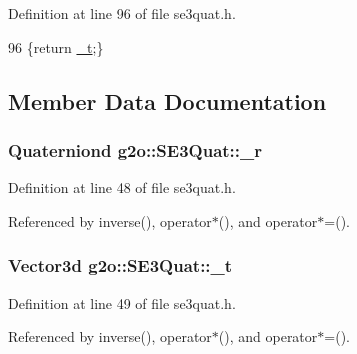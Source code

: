 Definition at line 96 of file se3quat.\+h.


\begin{DoxyCode}
96 \{\textcolor{keywordflow}{return} \hyperlink{classg2o_1_1SE3Quat_a7f0078e2750e8f821926f2d51202a809}{\_t};\}
\end{DoxyCode}


\subsection{Member Data Documentation}
\subsubsection[{\texorpdfstring{\+\_\+r}{_r}}]{\setlength{\rightskip}{0pt plus 5cm}Quaterniond g2o\+::\+S\+E3\+Quat\+::\+\_\+r\hspace{0.3cm}{\ttfamily [protected]}}\hypertarget{classg2o_1_1SE3Quat_a420255bcfca499dc2669b27fd373f665}{}\label{classg2o_1_1SE3Quat_a420255bcfca499dc2669b27fd373f665}


Definition at line 48 of file se3quat.\+h.



Referenced by inverse(), operator$\ast$(), and operator$\ast$=().

\subsubsection[{\texorpdfstring{\+\_\+t}{_t}}]{\setlength{\rightskip}{0pt plus 5cm}Vector3d g2o\+::\+S\+E3\+Quat\+::\+\_\+t\hspace{0.3cm}{\ttfamily [protected]}}\hypertarget{classg2o_1_1SE3Quat_a7f0078e2750e8f821926f2d51202a809}{}\label{classg2o_1_1SE3Quat_a7f0078e2750e8f821926f2d51202a809}


Definition at line 49 of file se3quat.\+h.



Referenced by inverse(), operator$\ast$(), and operator$\ast$=().

